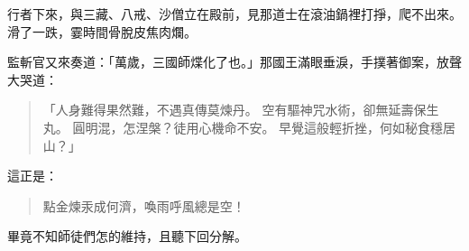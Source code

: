 行者下來，與三藏、八戒、沙僧立在殿前，見那道士在滾油鍋裡打掙，爬不出來。滑了一跌，霎時間骨脫皮焦肉爛。

監斬官又來奏道：「萬歲，三國師煠化了也。」那國王滿眼垂淚，手撲著御案，放聲大哭道：
\begin{quote}
「人身難得果然難，不遇真傳莫煉丹。
空有驅神咒水術，卻無延壽保生丸。
圓明混，怎涅槃？徒用心機命不安。
早覺這般輕折挫，何如秘食穩居山？」
\end{quote}

這正是：
\begin{quote}
點金煉汞成何濟，喚雨呼風總是空！
\end{quote}

畢竟不知師徒們怎的維持，且聽下回分解。

